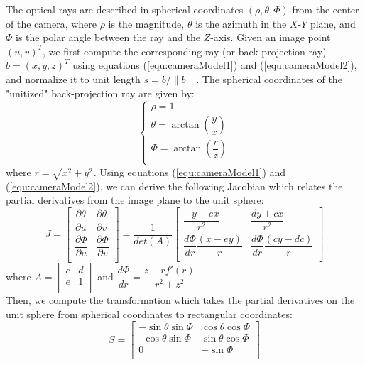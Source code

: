 The optical rays are described in spherical coordinates $(\rho, \theta, \Phi)$ from the center of the camera, where $\rho$ is the magnitude, $\theta$ is the azimuth in the $X$-$Y$ plane, and $\Phi$ is the polar angle between the ray and the $Z$-axis. Given an image point $(u,v)^T$, we first compute the corresponding ray (or back-projection ray) $b=(x, y, z)^T$ using equations (\ref{equ:cameraModel1}) and (\ref{equ:cameraModel2}), and normalize it to unit length $s = b/\|b\|$. The spherical coordinates of the "unitized" back-projection ray are given by:
\begin{equation}
\begin{cases}
\rho = 1\\[6pt]
\theta = \arctan(\dfrac{y}{x})\\[6pt]
\Phi = \arctan(\dfrac{r}{z})\\[6pt]
\end{cases}
\end{equation}
where $r = \sqrt{x^2+y^2}$. Using equations (\ref{equ:cameraModel1}) and (\ref{equ:cameraModel2}), we can derive the following Jacobian which relates the partial derivatives from the image plane to the unit sphere:
\begin{equation}
J =
\begin{bmatrix}
\dfrac{\partial\theta}{\partial u} & \dfrac{\partial\theta}{\partial v}\\[8pt]
\dfrac{\partial\Phi}{\partial u}	  & \dfrac{\partial\Phi}{\partial v}\\
\end{bmatrix}
=\dfrac{1}{det(A)}
\begin{bmatrix}
\dfrac{-y - ex}{r^2} & \dfrac{dy + cx}{r^2}\\[8pt]
\dfrac{d\Phi}{dr}\dfrac{(x-ey)}{r} & \dfrac{d\Phi}{dr}\dfrac{(cy - dc)}{r}\\
\end{bmatrix}
\end{equation}
where 
$
A = \begin{bmatrix}
c & d\\
e & 1\\
\end{bmatrix}
$
and 
$ \dfrac{d\Phi}{dr} = \dfrac{z - rf'(r)}{r^2 + z^2}$\\
Then, we compute the transformation which takes the partial derivatives on the unit sphere from spherical coordinates to rectangular coordinates:
\begin{equation}
S =
\begin{bmatrix}
-\sin\theta \sin\Phi & \cos\theta \cos\Phi\\
~~\cos\theta \sin\Phi & \sin\theta \cos\Phi\\
0 & -\sin\Phi\\
\end{bmatrix}
\end{equation}
